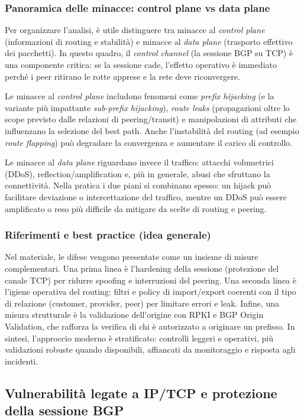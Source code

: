 \subsubsection{Panoramica delle minacce: control plane vs data plane}
Per organizzare l’analisi, è utile distinguere tra minacce al \emph{control plane} (informazioni di routing e stabilità) e minacce al \emph{data plane} (trasporto effettivo dei pacchetti). In questo quadro, il \emph{control channel} (la sessione BGP su TCP) è una componente critica: se la sessione cade, l’effetto operativo è immediato perché i peer ritirano le rotte apprese e la rete deve riconvergere.

Le minacce al \emph{control plane} includono fenomeni come \emph{prefix hijacking} (e la variante più impattante \emph{sub-prefix hijacking}), \emph{route leaks} (propagazioni oltre lo scope previsto dalle relazioni di peering/transit) e manipolazioni di attributi che influenzano la selezione del best path. Anche l’instabilità del routing (ad esempio \emph{route flapping}) può degradare la convergenza e aumentare il carico di controllo.

Le minacce al \emph{data plane} riguardano invece il traffico: attacchi volumetrici (DDoS), reflection/amplification e, più in generale, abusi che sfruttano la connettività. Nella pratica i due piani si combinano spesso: un hijack può facilitare deviazione o intercettazione del traffico, mentre un DDoS può essere amplificato o reso più difficile da mitigare da scelte di routing e peering.

\subsubsection{Riferimenti e best practice (idea generale)}
Nel materiale, le difese vengono presentate come un insieme di misure complementari. Una prima linea è l’hardening della sessione (protezione del canale TCP) per ridurre spoofing e interruzioni del peering. Una seconda linea è l’igiene operativa del routing: filtri e policy di import/export coerenti con il tipo di relazione (customer, provider, peer) per limitare errori e leak. Infine, una misura strutturale è la validazione dell’origine con RPKI e BGP Origin Validation, che rafforza la verifica di chi è autorizzato a originare un prefisso. In sintesi, l’approccio moderno è stratificato: controlli leggeri e operativi, più validazioni robuste quando disponibili, affiancati da monitoraggio e risposta agli incidenti.

\subsection{Vulnerabilità legate a IP/TCP e protezione della sessione BGP}

